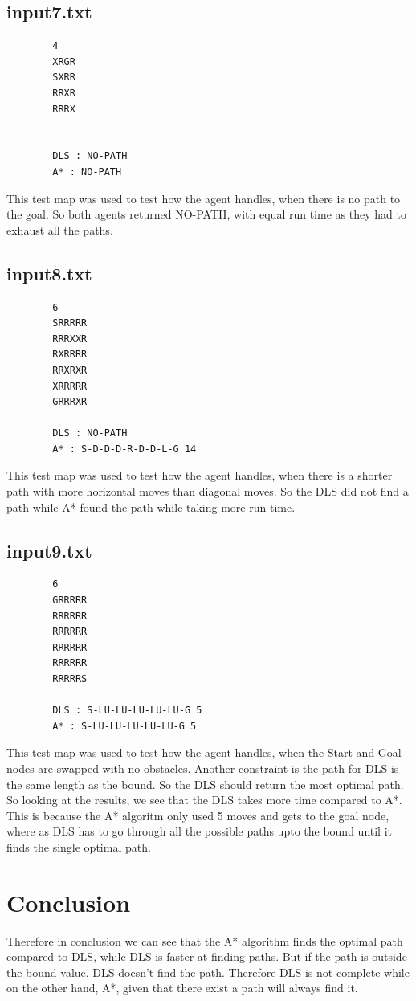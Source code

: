\documentclass{article}
\begin{document}
	\subsection{input7.txt}	
		\begin{lstlisting}
		4
		XRGR
		SXRR
		RRXR
		RRRX
		
		
		DLS : NO-PATH
		A* : NO-PATH
		\end{lstlisting}
		This test map was used to test how the agent handles, when there is no path to the goal. So both agents returned NO-PATH, with equal run time as they had to exhaust all the paths. \newline
	
	\subsection{input8.txt}	
		\begin{lstlisting}
		6
		SRRRRR
		RRRXXR
		RXRRRR
		RRXRXR
		XRRRRR
		GRRRXR
		
		DLS : NO-PATH
		A* : S-D-D-D-R-D-D-L-G 14
		\end{lstlisting}
		This test map was used to test how the agent handles, when there is a shorter path with more horizontal moves than diagonal moves. So the DLS did not find a path while A* found the path while taking more run time. \newline
		
	\subsection{input9.txt}	
		\begin{lstlisting}
		6
		GRRRRR
		RRRRRR
		RRRRRR
		RRRRRR
		RRRRRR
		RRRRRS
		
		DLS : S-LU-LU-LU-LU-LU-G 5
		A* : S-LU-LU-LU-LU-LU-G 5
		\end{lstlisting}
		This test map was used to test how the agent handles, when the Start and Goal nodes are swapped with no obstacles. Another constraint is the path for DLS is the same length as the bound. So the DLS should return the most optimal path. So looking at the results, we see that the DLS takes more time compared to A*. This is because the A* algoritm only used 5 moves and gets to the goal node, where as DLS has to go through all the possible paths upto the bound until it finds the single optimal path.\newline
	\section{Conclusion}
	Therefore in conclusion we can see that the A* algorithm finds the optimal path compared to DLS, while DLS is faster at finding paths. But if the path is outside the bound value, DLS doesn't find the path. Therefore DLS is not complete while on the other hand, A*, given that there exist a path will always find it.
	
\end{document}
